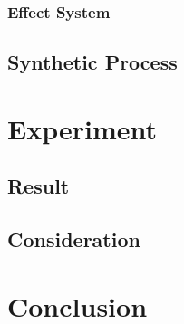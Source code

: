 \documentclass[12pt, a4paper, titlepage]{report}
\begin{document}
    \subsection{Effect System}
  \section{Synthetic Process}

\chapter{Experiment}\label{section:experiment}
\section{Result}
\section{Consideration}

\chapter{Conclusion}\label{section:conclusion}



\end{document}
